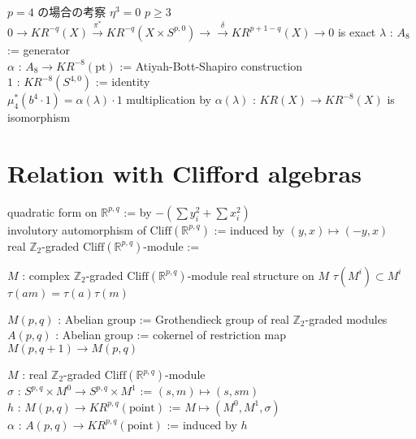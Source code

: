 \documentclass[dvipdfmx]{jsarticle}
\begin{document}
\begin{Theorem}
\itemnote
  \(p=4\) の場合の考察
\itemprop
  \Then \(\eta ^3 = 0\)
\itemprop
  \For \(p \geq 3\) \\
  \Then \(0 \to KR^{-q}(X) \overset{\pi^*}{\to} KR^{-q}(X \times S^{p,0}) \to \overset{\delta}{\to} KR^{p+1-q}(X) \to 0\) is exact
\itemprop
  \Let \(\lambda\) : \(A_8\) := generator \\
  \Let \(\alpha\) : \(A_8 \to KR^{-8}(\text{pt})\) := Atiyah-Bott-Shapiro construction \\
  \Let \(1\) : \(KR^{-8}(S^{4,0})\) := identity \\
  \Then \(\mu_4^*(b^4 \cdot 1) = \alpha(\lambda) \cdot 1\)
\itemprop
  \Then multiplication by \(\alpha(\lambda)\) : \(KR(X) \to KR^{-8}(X)\) is isomorphism
\end{Theorem}

\section*{Relation with Clifford algebras}

\begin{Definition}
\itemdefi
  \Define quadratic form on \(\mathbb{R}^{p,q}\) := by \(- (\sum y_i^2 + \sum x_i^2)\) \\
  \Define involutory automorphism of \(\text{Cliff}(\mathbb{R}^{p,q})\) := induced by \((y,x) \mapsto (-y, x)\) \\
\itemdefi
  \Define real \(\mathbb{Z}_2\)-graded \(\text{Cliff}(\mathbb{R}^{p,q})\)-module :=
  \begin{itemize}
    \itembase \(M\) : complex \(\mathbb{Z}_2\)-graded \(\text{Cliff}(\mathbb{R}^{p,q})\)-module
    \itemenum real structure on \(M\)
    \itemwith \(\tau(M^i) \subset M^i\)
    \itemwith \(\tau(am) = \tau(a) \tau(m)\)
  \end{itemize}
\itemdefi
  \Define \(M(p,q)\) : Abelian group := Grothendieck group of real \(\mathbb{Z}_2\)-graded modules \\
  \Define \(A(p,q)\) : Abelian group := cokernel of restriction map \(M(p,q+1) \to M(p,q)\)
\end{Definition}

\begin{Definition}
\itemdefi
  \For \(M\) : real \(\mathbb{Z}_2\)-graded \(\text{Cliff}(\mathbb{R}^{p,q})\)-module \\
  \Let \(\sigma\) : \(S^{p,q} \times M^0 \to S^{p,q} \times M^1\) := \((s,m) \mapsto (s, sm)\) \\
  \Define \(h\) : \(M(p,q) \to KR^{p,q}(\text{point})\) := \(M \mapsto (M^0, M^1, \sigma)\) \\
  \Define \(\alpha\) : \(A(p,q) \to KR^{p,q}(\text{point})\) := induced by \(h\)
\end{Definition}
\end{document}

